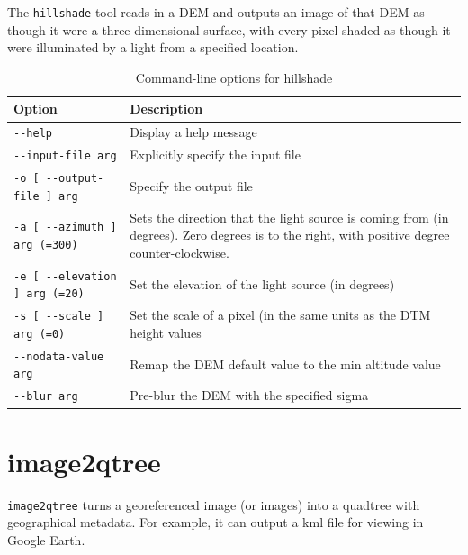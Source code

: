 The \verb#hillshade# tool reads in a DEM and outputs an image of that
DEM as though it were a three-dimensional surface, with every pixel
shaded as though it were illuminated by a light from a specified
location.

\begin{longtable}{|l|p{11cm}|}
\caption{Command-line options for hillshade}
\label{tbl:hillshade}
\endfirsthead
\endhead
\endfoot
\endlastfoot
\hline
Option & Description \\ \hline \hline
\verb#--help# & Display a help message\\ \hline
\verb#--input-file arg# & Explicitly specify the input file\\ \hline
\verb#-o [ --output-file ] arg# & Specify the output file\\ \hline
\verb#-a [ --azimuth ] arg (=300)# & Sets the direction that the light source is coming from (in degrees).  Zero degrees is to the right, with positive degree counter-clockwise.\\ \hline
\verb#-e [ --elevation ] arg (=20)# & Set the elevation of the light source (in degrees)\\ \hline
\verb#-s [ --scale ] arg (=0)# & Set the scale of a pixel (in the same units as the DTM height values\\ \hline
\verb#--nodata-value arg# & Remap the DEM default value to the min altitude value\\ \hline
\verb#--blur arg# & Pre-blur the DEM with the specified sigma\\ \hline
\end{longtable}

\section{image2qtree}
\label{sec:image2qtree}

\verb#image2qtree# turns a georeferenced image (or images) into a quadtree with geographical metadata.  For example, it can output a kml file for viewing in Google Earth.


